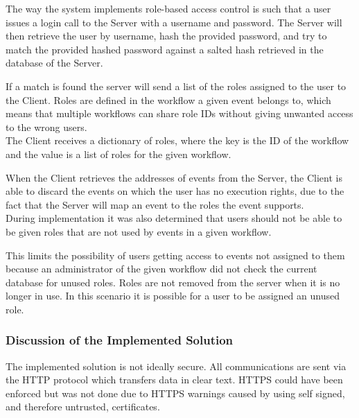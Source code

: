 The way the system implements role-based access control is such that a user issues a login call to the Server with a username and password. The Server will then retrieve the user by username, hash the provided password, and try to match the provided hashed password against a salted hash retrieved in the database of the Server. 

If a match is found the server will send a list of the roles assigned to the user to the Client. Roles are defined in the workflow a given event belongs to, which means that multiple workflows can share role IDs without giving unwanted access to the wrong users.\\

The Client receives a dictionary of roles, where the key is the ID of the workflow and the value is a list of roles for the given workflow.

When the Client retrieves the addresses of events from the Server, the Client is able to discard the events on which the user has no execution rights, due to the fact that the Server will map an event to the roles the event supports.\\

During implementation it was also determined that users should not be able to be given roles that are not used by events in a given workflow. 

This limits the possibility of users getting access to events not assigned to them because an administrator of the given workflow did not check the current database for unused roles. Roles are not removed from the server when it is no longer in use. In this scenario it is possible for a user to be assigned an unused role.

\subsubsection{Discussion of the Implemented Solution}
The implemented solution is not ideally secure. All communications are sent via the HTTP protocol which transfers data in clear text. HTTPS could have been enforced but was not done due to HTTPS warnings caused by using self signed, and therefore untrusted, certificates. \\

